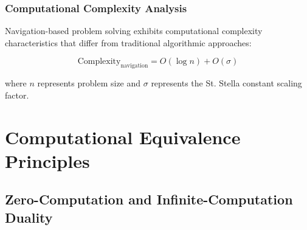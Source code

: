 \documentclass[12pt,a4paper]{article}
\begin{document}
\begin{figure}[H]
\begin{center}
\end{center}
\end{figure}

\subsubsection{Computational Complexity Analysis}

Navigation-based problem solving exhibits computational complexity characteristics that differ from traditional algorithmic approaches:

\begin{equation}
\text{Complexity}_{\text{navigation}} = O(\log n) + O(\sigma)
\label{eq:navigation_complexity}
\end{equation}

where $n$ represents problem size and $\sigma$ represents the St. Stella constant scaling factor.

\section{Computational Equivalence Principles}

\subsection{Zero-Computation and Infinite-Computation Duality}
\end{document}
